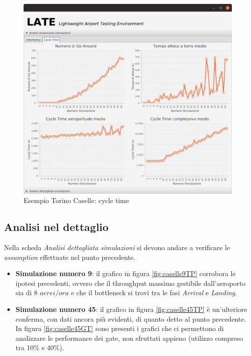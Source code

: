 \documentclass[a4paper, 12pt]{article}
\begin{document}
\begin{figure}[h]
\caption{Esempio Torino Caselle: cycle time}
 \label{fig:caselleCT}
\hfill \includegraphics[height=0.44\textheight]{resources/images/Risultati_02.png}\hspace*{\fill}
\end{figure}

\subsection{Analisi nel dettaglio}

Nella scheda \textit{Analisi dettagliata simulazioni} si devono andare a verificare le \textit{assumption} effettuate nel punto precedente.

\begin{itemize}
	\item \textbf{Simulazione numero 9}: il grafico in figura \ref{fig:caselle9TP} corrobora le ipotesi precedenti, ovvero che il throughput massimo gestibile dall'aeroporto sia di 8 $aerei/ora$ e che il bottleneck si trovi tra le fasi \textit{Arrival} e \textit{Landing}.
	\item \textbf{Simulazione numero 45}: il grafico in figura \ref{fig:caselle45TP} è un'ulteriore conferma, con dati ancora più evidenti, di quanto detto al punto precedente. In figura \ref{fig:caselle45GT} sono presenti i grafici che ci permettono di analizzare le performance dei gate, non sfruttati appieno (utilizzo compreso tra 10\% e 40\%).
	
\end{itemize}
\end{document}
